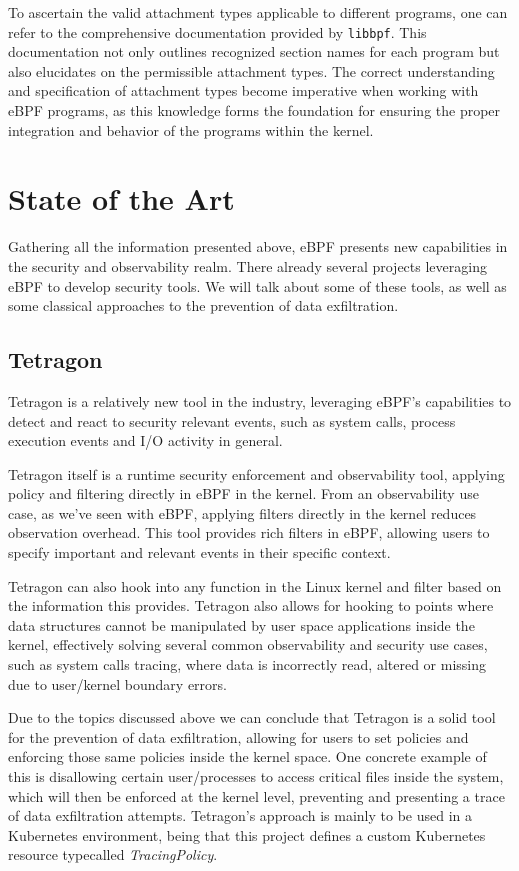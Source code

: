 To ascertain the valid attachment types applicable to different programs, one can refer to the comprehensive documentation provided by \texttt{libbpf}. This documentation not only outlines recognized section names for each program but also elucidates on the permissible attachment types. The correct understanding and specification of attachment types become imperative when working with eBPF programs, as this knowledge forms the foundation for ensuring the proper integration and behavior of the programs within the kernel.


\section{State of the Art}

Gathering all the information presented above, eBPF presents new capabilities in  the security and observability realm. There already several projects leveraging eBPF to develop security tools.
We will talk about some of these tools, as well as some classical approaches to the prevention of data exfiltration.

\subsection{Tetragon}

Tetragon \cite{tetragon} is a relatively new tool in the industry, leveraging eBPF's capabilities to detect and react to security relevant events, such as system calls, process execution events and I/O activity in general.

Tetragon itself is a runtime security enforcement and observability tool, applying policy and filtering directly in eBPF in the kernel. From an observability use case, as we've seen with eBPF, applying filters directly in the kernel reduces observation overhead. This tool provides rich filters in eBPF, allowing users to specify important and relevant events in their specific context.

Tetragon can also hook into any function in the Linux kernel and filter based on the information this provides. Tetragon also allows for hooking to points where data structures cannot be manipulated by user space applications inside the kernel, effectively solving several common observability and security use cases, such as system calls tracing, where data is incorrectly read, altered or missing due to user/kernel boundary errors.

Due to the topics discussed above we can conclude that Tetragon is a solid tool for the prevention of data exfiltration, allowing for users to set policies and enforcing those same policies inside the kernel space. One concrete example of this is disallowing certain user/processes to access critical files inside the system, which will then be enforced at the kernel level, preventing and presenting a trace of data exfiltration attempts. Tetragon's approach is mainly to be used in a Kubernetes environment, being that this project defines a custom Kubernetes resource typecalled \textit{TracingPolicy}.

